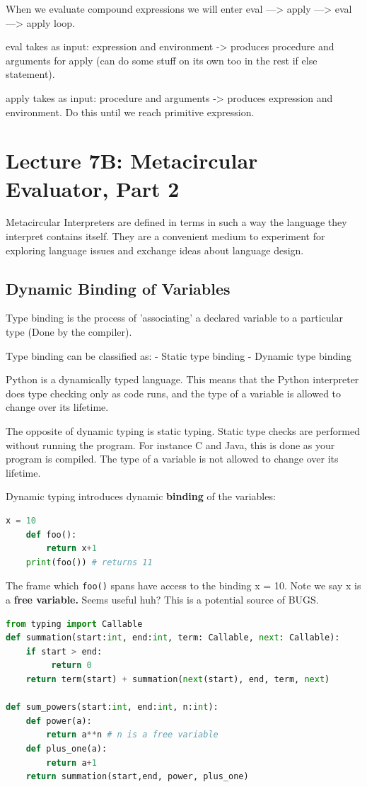 \documentclass[a4paper,twoside]{article}
\numberwithin{equation}{section}
\begin{document}
When we evaluate compound expressions we will enter eval ---> apply ---> eval ---> apply loop.

eval takes as input: expression and environment -> produces procedure and arguments for apply
(can do some stuff on its own too in the rest if else statement).

apply takes as input: procedure and arguments -> produces expression and environment.
Do this until we reach primitive expression.

\section{Lecture 7B: Metacircular Evaluator, Part 2}
Metacircular Interpreters are defined in terms in such a way the language they interpret contains itself.
They are a convenient medium to experiment for exploring language issues and exchange ideas about language design.

\subsection{Dynamic Binding of Variables}
Type binding is the process of 'associating' a declared variable to a particular type
(Done by the compiler).

Type binding can be classified as:
- Static type binding
- Dynamic type binding

Python is a dynamically typed language. This means that the Python interpreter does type checking
only as code runs, and the type of a variable is allowed to change over its lifetime.

The opposite of dynamic typing is static typing. Static type checks are performed without running
the program. For instance C and Java, this is done as your program is compiled.
The type of a variable is not allowed to change over its lifetime.

Dynamic typing introduces dynamic \textbf{binding} of the variables:
\begin{lstlisting}[language = Python]
    x = 10
    def foo():
        return x+1
    print(foo()) # returns 11
\end{lstlisting}
The frame which \texttt{foo()} spans have access to the binding x = 10. Note we say x is a \textbf{free variable.}
Seems useful huh? This is a potential source of BUGS.

\begin{lstlisting}[language = Python]
from typing import Callable
def summation(start:int, end:int, term: Callable, next: Callable):
    if start > end:
         return 0
    return term(start) + summation(next(start), end, term, next)

def sum_powers(start:int, end:int, n:int):
    def power(a):
        return a**n # n is a free variable
    def plus_one(a):
        return a+1
    return summation(start,end, power, plus_one)
\end{lstlisting}
\end{document}
